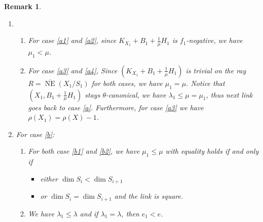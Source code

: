 \documentclass{article}
\newtheorem{rmk}[defn]{Remark}
\begin{document}
\begin{rmk}
  
\begin{enumerate}
  \item 
  \begin{enumerate}
    \item For case \ref{a1} and \ref{a2},  since $ K_{X_1}+B_1+\frac{1}{\mu}H_1 $ is $ f_1 $-negative, we have    $\mu_1<\mu$.
    \item For case \ref{a3} and \ref{a4}, Since $ (K_{X_1}+B_1+\frac{1}{\mu}H_1) $ is trivial on the ray $ R=\overline{\operatorname{NE}}(X_1/S_1) $ for both cases, we have $\mu_1=\mu$.
      Notice that $ (X_1,B_1+\frac{1}{\mu}H_1) $ stays $ \theta $-canonical, we have $\lambda_1\leqslant \mu=\mu_1$, thus next link goes back to case \ref{a}. Furthermore,   for case \ref{a3} we have $\rho(X_1)=\rho(X)-1$.
  \end{enumerate} 
\item For case \ref{b}: 
  \begin{enumerate}
    \item For both case \ref{b1} and \ref{b2}, we have   $\mu_1\leqslant \mu$
    with equality holds if and only if 
    \begin{itemize}
      \item 
        either $\dim S_i<\dim S_{i+1} $
        \item  
        or $\dim S_i=\dim S_{i+1}$ and the link is square.
    \end{itemize}
  \item We have  $\lambda_1\leqslant \lambda$ and if $ \lambda_1=\lambda $, then   $e_1<e$.
  \end{enumerate} 
\end{enumerate}
\end{rmk}
\end{document}
